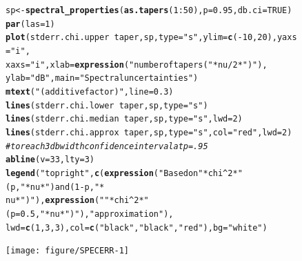 \documentclass[10pt]{article}\usepackage[]{graphicx}\usepackage[]{color}
\makeatletter
\newcommand{\hlnum}[1]{\textcolor[rgb]{0.686,0.059,0.569}{#1}}%
\newcommand{\hlstr}[1]{\textcolor[rgb]{0.192,0.494,0.8}{#1}}%
\newcommand{\hlcom}[1]{\textcolor[rgb]{0.678,0.584,0.686}{\textit{#1}}}%
\newcommand{\hlopt}[1]{\textcolor[rgb]{0,0,0}{#1}}%
\newcommand{\hlstd}[1]{\textcolor[rgb]{0.345,0.345,0.345}{#1}}%
\newcommand{\hlkwb}[1]{\textcolor[rgb]{0.69,0.353,0.396}{#1}}%
\newcommand{\hlkwc}[1]{\textcolor[rgb]{0.333,0.667,0.333}{#1}}%
\newcommand{\hlkwd}[1]{\textcolor[rgb]{0.737,0.353,0.396}{\textbf{#1}}}%
\newenvironment{kframe}{%
 \def\at@end@of@kframe{}%
 \ifinner\ifhmode%
  \def\at@end@of@kframe{\end{minipage}}%
  \begin{minipage}{\columnwidth}%
 \fi\fi%
 \def\FrameCommand##1{\hskip\@totalleftmargin \hskip-\fboxsep
 \colorbox{shadecolor}{##1}\hskip-\fboxsep
     \hskip-\linewidth \hskip-\@totalleftmargin \hskip\columnwidth}%
 \MakeFramed {\advance\hsize-\width
   \@totalleftmargin\z@ \linewidth\hsize
   \@setminipage}}%
 {\par\unskip\endMakeFramed%
 \at@end@of@kframe}
\newenvironment{knitrout}{}{} %
\makeatother
\begin{document}
\begin{figure}[h!]
\begin{center}
\begin{knitrout}\small
{}\color{fgcolor}\begin{kframe}
\begin{alltt}
\hlstd{sp} \hlkwb{<-} \hlkwd{spectral_properties}\hlstd{(}\hlkwd{as.tapers}\hlstd{(}\hlnum{1}\hlopt{:}\hlnum{50}\hlstd{),} \hlkwc{p} \hlstd{=} \hlnum{0.95}\hlstd{,} \hlkwc{db.ci} \hlstd{=} \hlnum{TRUE}\hlstd{)}
\hlkwd{par}\hlstd{(}\hlkwc{las} \hlstd{=} \hlnum{1}\hlstd{)}
\hlkwd{plot}\hlstd{(stderr.chi.upper} \hlopt{~} \hlstd{taper, sp,} \hlkwc{type} \hlstd{=} \hlstr{"s"}\hlstd{,} \hlkwc{ylim} \hlstd{=} \hlkwd{c}\hlstd{(}\hlopt{-}\hlnum{10}\hlstd{,} \hlnum{20}\hlstd{),} \hlkwc{yaxs} \hlstd{=} \hlstr{"i"}\hlstd{,}
    \hlkwc{xaxs} \hlstd{=} \hlstr{"i"}\hlstd{,} \hlkwc{xlab} \hlstd{=} \hlkwd{expression}\hlstd{(}\hlstr{"number of tapers ("} \hlopt{*} \hlstd{nu}\hlopt{/}\hlnum{2} \hlopt{*} \hlstr{")"}\hlstd{),}
    \hlkwc{ylab} \hlstd{=} \hlstr{"dB"}\hlstd{,} \hlkwc{main} \hlstd{=} \hlstr{"Spectral uncertainties"}\hlstd{)}
\hlkwd{mtext}\hlstd{(}\hlstr{"(additive factor)"}\hlstd{,} \hlkwc{line} \hlstd{=} \hlnum{0.3}\hlstd{)}
\hlkwd{lines}\hlstd{(stderr.chi.lower} \hlopt{~} \hlstd{taper, sp,} \hlkwc{type} \hlstd{=} \hlstr{"s"}\hlstd{)}
\hlkwd{lines}\hlstd{(stderr.chi.median} \hlopt{~} \hlstd{taper, sp,} \hlkwc{type} \hlstd{=} \hlstr{"s"}\hlstd{,} \hlkwc{lwd} \hlstd{=} \hlnum{2}\hlstd{)}
\hlkwd{lines}\hlstd{(stderr.chi.approx} \hlopt{~} \hlstd{taper, sp,} \hlkwc{type} \hlstd{=} \hlstr{"s"}\hlstd{,} \hlkwc{col} \hlstd{=} \hlstr{"red"}\hlstd{,} \hlkwc{lwd} \hlstd{=} \hlnum{2}\hlstd{)}
\hlcom{# to reach 3 db width confidence interval at p=.95}
\hlkwd{abline}\hlstd{(}\hlkwc{v} \hlstd{=} \hlnum{33}\hlstd{,} \hlkwc{lty} \hlstd{=} \hlnum{3}\hlstd{)}
\hlkwd{legend}\hlstd{(}\hlstr{"topright"}\hlstd{,} \hlkwd{c}\hlstd{(}\hlkwd{expression}\hlstd{(}\hlstr{"Based on "} \hlopt{*} \hlstd{chi}\hlopt{^}\hlnum{2} \hlopt{*} \hlstr{"(p,"} \hlopt{*} \hlstd{nu} \hlopt{*} \hlstr{") and (1-p,"} \hlopt{*}
    \hlstd{nu} \hlopt{*} \hlstr{")"}\hlstd{),} \hlkwd{expression}\hlstd{(}\hlstr{""} \hlopt{*} \hlstd{chi}\hlopt{^}\hlnum{2} \hlopt{*} \hlstr{"(p=0.5,"} \hlopt{*} \hlstd{nu} \hlopt{*} \hlstr{")"}\hlstd{),} \hlstr{"approximation"}\hlstd{),}
    \hlkwc{lwd} \hlstd{=} \hlkwd{c}\hlstd{(}\hlnum{1}\hlstd{,} \hlnum{3}\hlstd{,} \hlnum{3}\hlstd{),} \hlkwc{col} \hlstd{=} \hlkwd{c}\hlstd{(}\hlstr{"black"}\hlstd{,} \hlstr{"black"}\hlstd{,} \hlstr{"red"}\hlstd{),} \hlkwc{bg} \hlstd{=} \hlstr{"white"}\hlstd{)}
\end{alltt}
\end{kframe}
\texttt{[image: figure/SPECERR-1]} 


\end{knitrout}
\end{center}
\end{figure}
\end{document}
